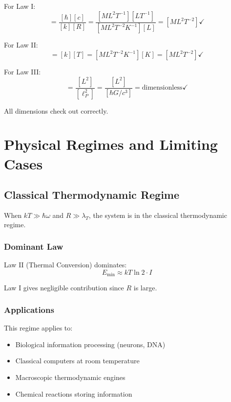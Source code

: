 \documentclass[11pt,a4paper]{article}
\theoremstyle{plain}
\theoremstyle{definition}
\theoremstyle{remark}
\begin{document}
For Law I:
\begin{equation}
[E] = \frac{[\hbar][c]}{[k][R]} = \frac{[ML^2T^{-1}][LT^{-1}]}{[ML^2T^{-2}K^{-1}][L]} = [ML^2T^{-2}] \checkmark
\end{equation}

For Law II:
\begin{equation}
[E] = [k][T] = [ML^2T^{-2}K^{-1}][K] = [ML^2T^{-2}] \checkmark
\end{equation}

For Law III:
\begin{equation}
[I] = \frac{[L^2]}{[\ell_P^2]} = \frac{[L^2]}{[\hbar G/c^3]} = \text{dimensionless} \checkmark
\end{equation}

All dimensions check out correctly.

\section{Physical Regimes and Limiting Cases}
\label{sec:regimes}

\subsection{Classical Thermodynamic Regime}

When $kT \gg \hbar\omega$ and $R \gg \lambda_T$, the system is in the classical thermodynamic regime.

\subsubsection{Dominant Law}

Law II (Thermal Conversion) dominates:
\begin{equation}
E_{\text{min}} \approx kT\ln 2\cdot I
\end{equation}

Law I gives negligible contribution since $R$ is large.

\subsubsection{Applications}

This regime applies to:
\begin{itemize}[leftmargin=*]
\item Biological information processing (neurons, DNA)
\item Classical computers at room temperature
\item Macroscopic thermodynamic engines
\item Chemical reactions storing information
\end{itemize}
\end{document}
